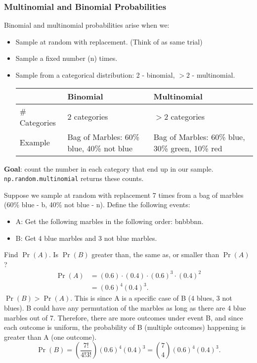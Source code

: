 \subsubsection{Multinomial and Binomial Probabilities}
Binomial and multinomial probabilities arise when we: 
\begin{itemize}
\item Sample at random with replacement. (Think of as same trial)
\item Sample a fixed number (n) times.
\item Sample from a categorical distribution: 2 - binomial, $>2$ - multinomial.
\begin{center}
\begin{tabular}{@{}lll@{}}
\toprule
    & Binomial & Multinomial \\
\midrule
    \# Categories & 2 categories & $>2$ categories \\
    Example & Bag of Marbles: 60\% blue, 40\% not blue & Bag of Marbles: 60\% blue, 30\% green, 10\% red \\
\bottomrule
\end{tabular}
\end{center}
\end{itemize}
\textbf{Goal}: count the number in each category that end up in our sample. \texttt{np.random.multinomial} returns these counts.

\begin{example}{Suppose we sample at random with replacement 7 times from a bag of marbles (60\% blue - b, 40\% not blue - n). Define the following events:
\begin{itemize}
\item A: Get the following marbles in the following order: bnbbbnn.
\item B: Get 4 blue marbles and 3 not blue marbles.
\end{itemize}
Find $\Pr(A)$. Is $\Pr(B)$ greater than, the same as, or smaller than $\Pr(A)$?
\tcbline 
\begin{align*}
    \Pr(A) &= (0.6) \cdot (0.4) \cdot (0.6)^3 \cdot (0.4)^2 \\
    &= (0.6)^4(0.4)^3
.\end{align*}
$\Pr(B) > \Pr(A)$. This is since A is a specific case of B (4 blues, 3 not blues). B could have any permutation of the marbles as long as there are 4 blue marbles out of 7. Therefore, there are more outcomes under event B, and since each outcome is uniform, the probability of B (multiple outcomes) happening is greater than A (one outcome).
\[
\Pr(B) = \left( \frac{7!}{4!3!} \right) (0.6)^4 (0.4)^3 = \binom{7}{4} (0.6)^4 (0.4)^3
.\]
}
\end{example}

